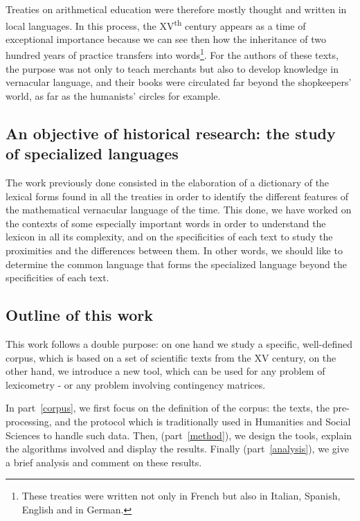 \documentclass[preprint]{elsarticle}
\begin{document}
Treaties on arithmetical education were therefore mostly thought and written in local languages. In this process, the XV\textsuperscript{th} century appears as a time of exceptional importance because we can see then how the inheritance of two hundred years of practice transfers into words\footnote{These treaties were written not only in French but also in Italian, Spanish, English and in German.}. For the authors of these texts, the purpose was not only to teach merchants but also to develop knowledge in vernacular language, and their books were circulated far beyond the shopkeepers' world, as far as the humanists' circles for example.\\

\subsection*{An objective of historical research: the study of specialized languages}

The work previously done \cite{lamasse2012} consisted in the elaboration of a dictionary of the lexical forms found in all the treaties in order to identify the different features of the mathematical vernacular language of the time. This done, we have worked on the contexts of some especially important words in order to understand the lexicon in all its complexity, and on the specificities of each text to study the proximities and the differences between them. In other words, we should like to determine the common language that forms the specialized language beyond the specificities of each text.

\subsection*{Outline of this work}

This work follows a double purpose: on one hand we study a specific, well-defined corpus, which is based on a set of scientific texts from the XV century, on the other hand, we introduce a new tool, which can be used for any problem of lexicometry - or any problem involving contingency matrices.

In part~\ref{corpus}, we first focus on the definition of the corpus: the texts, the pre-processing, and the protocol which is traditionally used in Humanities and Social Sciences to handle such data. Then, (part~\ref{method}), we design the tools, explain the algorithms involved and display the results. Finally (part~\ref{analysis}), we give a brief analysis and comment on these results.
\end{document}
